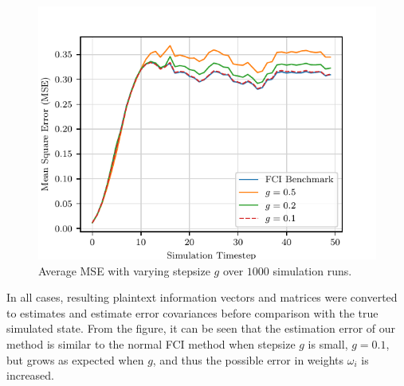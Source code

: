 \begin{figure}[htbp]
    \centering
    \includegraphics{figures/cloud_fusion_secfci_sim_error.pdf}
    \caption{Average MSE with varying stepsize $g$ over $1000$ simulation runs.}
    \label{fig:cloud_fusion:secfci_sim_error}
 \end{figure}
 In all cases, resulting plaintext information vectors and matrices were converted to estimates and estimate error covariances before comparison with the true simulated state. From the figure, it can be seen that the estimation error of our method is similar to the normal FCI method when stepsize $g$ is small, $g=0.1$, but grows as expected when $g$, and thus the possible error in weights $\omega_i$ is increased.

